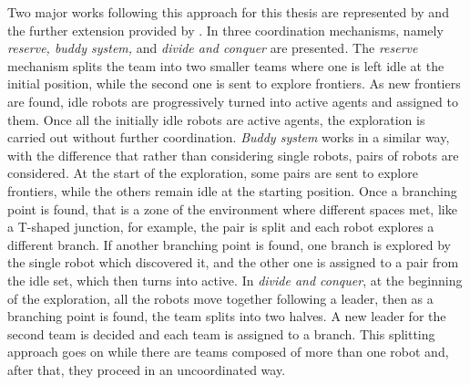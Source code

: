 Two major works following this approach for this thesis are represented
by \cite{Rogers2013} and the further extension provided by \cite{Cattaneo2017}.
In \cite{Rogers2013} three coordination mechanisms, namely \emph{reserve,
buddy system, }and \emph{divide and conquer }are presented\emph{.
}The \emph{reserve }mechanism splits the team into two smaller teams
where one is left idle at the initial position, while the second one
is sent to explore frontiers. As new frontiers are found, idle robots
are progressively turned into active agents and assigned to them.
Once all the initially idle robots are active agents, the exploration
is carried out without further coordination. \emph{Buddy system }works
in a similar way, with the difference that rather than considering
single robots, pairs of robots are considered. At the start of the
exploration, some pairs are sent to explore frontiers, while the others
remain idle at the starting position. Once a branching point is found,
that is a zone of the environment where different spaces met, like
a T-shaped junction, for example, the pair is split and each robot
explores a different branch. If another branching point is found,
one branch is explored by the single robot which discovered it, and
the other one is assigned to a pair from the idle set, which then
turns into active. In \emph{divide and conquer},\emph{ }at the beginning
of the exploration, all the robots move together following a leader,
then as a branching point is found, the team splits into two halves.
A new leader for the second team is decided and each team is assigned
to a branch. This splitting approach goes on while there are teams
composed of more than one robot and, after that, they proceed in an
uncoordinated way.

